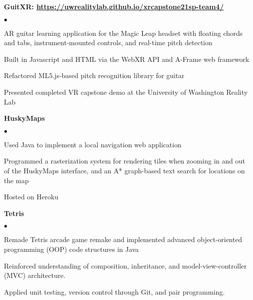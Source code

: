 \documentclass[margin,line]{res}
\newenvironment{list2}{
  \begin{list}{$\bullet$}{%
      \setlength{\itemsep}{0in}
      \setlength{\parsep}{0in} \setlength{\parskip}{0in}
      \setlength{\topsep}{0in} \setlength{\partopsep}{0in} 
      \setlength{\leftmargin}{0.2in}}}{\end{list}}
\begin{document}
\begin{resume}

{\bf GuitXR: \url{https://uwrealitylab.github.io/xrcapstone21sp-team4/}} %
\begin{list2}
\item AR guitar learning application for the Magic Leap headset with floating chords and tabs, instrument-mounted controls, and real-time pitch detection
\item Built in Javascript and HTML via the WebXR API and A-Frame web framework
\item Refactored ML5.js-based pitch recognition library for guitar 
\item Presented completed VR capstone demo at the University of Washington Reality Lab
\end{list2}


{\bf HuskyMaps} %
\begin{list2}
	\item Used Java to implement a local navigation web application
	\item Programmed a rasterization system for rendering tiles when zooming in and out of the HuskyMaps interface, and an A* graph-based text search for locations on the map
	\item Hosted on Heroku
\end{list2}

{\bf Tetris} %
\begin{list2}
\item Remade Tetris arcade game remake and implemented advanced object-oriented programming (OOP) code structures in Java
\item Reinforced understanding of composition, inheritance, and model-view-controller (MVC) architecture. 
\item Applied unit testing, version control through Git, and pair programming.
\end{list2}



\end{resume}
\end{document}
